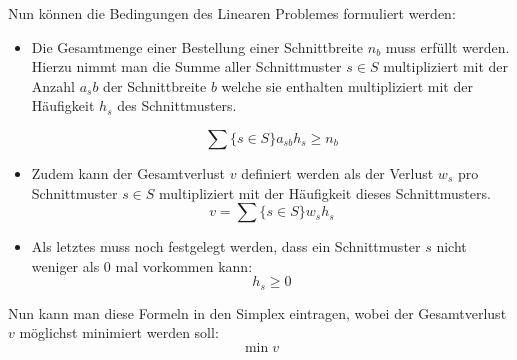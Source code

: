 Nun können die Bedingungen des Linearen Problemes formuliert werden:

\begin{itemize}
\item Die Gesamtmenge einer Bestellung einer Schnittbreite $n_b$ muss erfüllt werden. Hierzu nimmt man die Summe aller Schnittmuster $s \in S$ multipliziert mit der Anzahl $a_sb$ der Schnittbreite $b$ welche sie enthalten multipliziert mit der Häufigkeit $h_s$ des Schnittmusters.

\[ \sum\{s \in S\}a_{sb} h_s \geq n_b \]
\item Zudem kann der Gesamtverlust $v$ definiert werden als der Verlust $w_s$ pro Schnittmuster $s \in S$ multipliziert mit der Häufigkeit dieses Schnittmusters.
\[ v = \sum\{s \in S\}w_s h_s  \] 
\item Als letztes muss noch festgelegt werden, dass ein Schnittmuster $s$ nicht weniger als 0 mal vorkommen kann:
\[ h_s \geq 0 \]
\end{itemize}

Nun kann man diese Formeln in den Simplex eintragen, wobei der Gesamtverlust $v$ möglichst minimiert werden soll: 
\[ \min v \] 